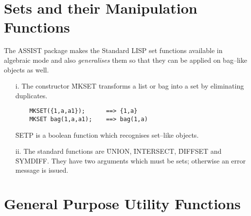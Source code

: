 \section{Sets and their Manipulation Functions}
\label{A-SETS}

The ASSIST package makes the Standard LISP set functions available in
algebraic mode and also {\em generalises} them so that they can be
applied on bag--like objects as well.
\begin{itemize}
\item[i.]
The constructor \f{MKSET} transforms a list or bag into
a set by eliminating duplicates.
\begin{verbatim}
	MKSET({1,a,a1});      ==> {1,a}
	MKSET bag(1,a,a1);    ==> bag(1,a)
\end{verbatim}

\f{SETP} is a boolean function which recognises
set--like objects.
\item[ii.]
The standard functions are \f{UNION},
\f{INTERSECT}, \f{DIFFSET}
and \f{SYMDIFF}.
They have two arguments which must be sets;  otherwise an error message
is issued.
\end{itemize}

\section{General Purpose Utility Functions}

